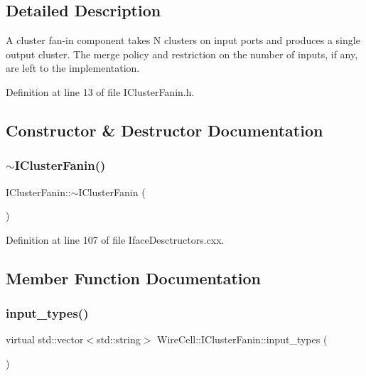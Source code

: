 \subsection{Detailed Description}
A cluster fan-\/in component takes N clusters on input ports and produces a single output cluster. The merge policy and restriction on the number of inputs, if any, are left to the implementation. 

Definition at line 13 of file I\+Cluster\+Fanin.\+h.



\subsection{Constructor \& Destructor Documentation}
\mbox{\label{class_wire_cell_1_1_i_cluster_fanin_a139c9e421801b80c19e3270622221e2f}} 
\subsubsection{\texorpdfstring{$\sim$\+I\+Cluster\+Fanin()}{~IClusterFanin()}}
{\footnotesize\ttfamily I\+Cluster\+Fanin\+::$\sim$\+I\+Cluster\+Fanin (\begin{DoxyParamCaption}{ }\end{DoxyParamCaption})\hspace{0.3cm}{\ttfamily [virtual]}}



Definition at line 107 of file Iface\+Desctructors.\+cxx.



\subsection{Member Function Documentation}
\mbox{\label{class_wire_cell_1_1_i_cluster_fanin_a4021793d08233b3cb10f788d20d313c2}} 
\subsubsection{\texorpdfstring{input\+\_\+types()}{input\_types()}}
{\footnotesize\ttfamily virtual std\+::vector$<$std\+::string$>$ Wire\+Cell\+::\+I\+Cluster\+Fanin\+::input\+\_\+types (\begin{DoxyParamCaption}{ }\end{DoxyParamCaption})\hspace{0.3cm}{\ttfamily [pure virtual]}}



